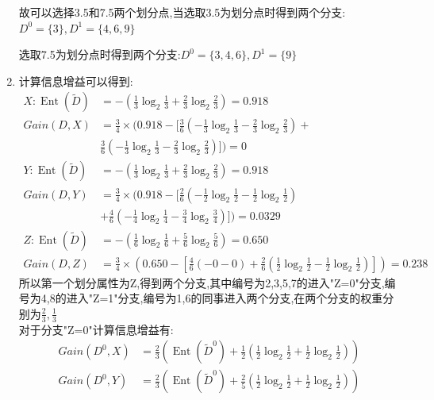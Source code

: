 \documentclass[answers]{exam}  %
\begin{document}
\begin{questions}
\begin{solution}
\begin{enumerate}
                  故可以选择3.5和7.5两个划分点,当选取3.5为划分点时得到两个分支:$D^0=\{3\},D^1=\{4,6,9\}$

                  选取7.5为划分点时得到两个分支:$D^0=\{3,4,6\},D^1=\{9\}$
            \item 计算信息增益可以得到:
                  \begin{align*}
                      X:\operatorname{Ent}(\tilde{D})   & =-(\frac{1}{3} \log_2\frac{1}{3} +\frac{2}{3} \log_2\frac{2}{3}) =0.918                                                            \\
                      Gain(D,X)                         & =\frac{3}{4} \times (0.918-[\frac{3}{6} (-\frac{1}{3} \log_2\frac{1}{3} -\frac{2}{3} \log_2\frac{2}{3})+                           \\&\frac{3}{6} (-\frac{1}{3} \log_2\frac{1}{3} -\frac{2}{3}\log_2\frac{2}{3})])=0 \\
                      Y:\operatorname{Ent}(\tilde{D})   & =-(\frac{1}{3} \log_2\frac{1}{3} +\frac{2}{3} \log_2\frac{2}{3}) =0.918                                                            \\Gain(D,Y)&=\frac{3}{4} \times (0.918-[\frac{2}{6} (-\frac{1}{2} \log_2\frac{1}{2} -\frac{1}{2} \log_2\frac{1}{2})\\&+\frac{4}{6} (-\frac{1}{4} \log_2\frac{1}{4} -\frac{3}{4}\log_2\frac{3}{4})])=0.0329\\
                      Z:  \operatorname{Ent}(\tilde{D}) & =-(\frac{1}{6} \log_2\frac{1}{6} +\frac{5}{6} \log_2\frac{5}{6})=0.650                                                             \\
                      Gain(D,Z)                         & =\frac{3}{4} \times (0.650-[\frac{4}{6} (-0-0)+\frac{2}{6} (\frac{1}{2} \log_2\frac{1}{2} -\frac{1}{2} \log_2\frac{1}{2} )])=0.238
                  \end{align*}
                  所以第一个划分属性为Z,得到两个分支,其中编号为2,3,5,7的进入"Z=0"分支,编号为4,8的进入"Z=1"分支,编号为1,6的同事进入两个分支,在两个分支的权重分别为$\frac{2}{3},\frac{1}{3} $\\
                  对于分支"Z=0"计算信息增益有:
                  \begin{align*}
                      Gain(D^0,X) & =\frac{2}{3} (\operatorname{Ent}(\tilde{D}^0)+\frac{1}{2} (\frac{1}{2} \log_2 \frac{1}{2}+\frac{1}{2} \log_2 \frac{1}{2})) \\
                      Gain(D^0,Y) & =\frac{2}{3} (\operatorname{Ent}(\tilde{D}^0)+\frac{2}{5} (\frac{1}{2} \log_2 \frac{1}{2}+\frac{1}{2} \log_2 \frac{1}{2}))

\end{align*}
\end{enumerate}
\end{solution}
\end{questions}
\end{document}
